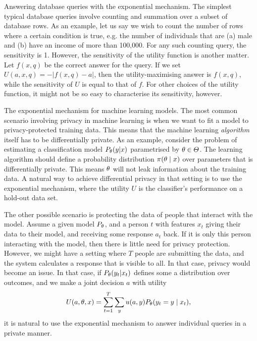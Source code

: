 \begin{exampleblock}{Answering database queries with the exponential mechanism.}
  The simplest typical database queries involve counting and summation over a subset of database rows. As an example, let us say we wish to count the number of rows where a certain condition is true, e.g. the number of individuals that are (a) male  and (b) have an income of more than 100,000. For any such counting query, the sensitivity is 1. However, the sensitivity of the utility function is another matter. Let $f(x,q)$ be the correct answer for the query. If we set $U(a,x,q) = -|f(x,q) - a|$, then the utility-maximising answer is $f(x,q)$, while the sensitivity of $U$ is equal to that of $f$. For other choices of the utility function, it might not be so easy to characterise its sensitivity, however.
\end{exampleblock}
\begin{exampleblock}{The exponential mechanism for machine learning models.}
  The most common scenario involving privacy in machine learning is  when we want to fit a model to privacy-protected training data. This means that the machine learning \emph{algorithm} itself has to be differentially private. As an example, consider the problem of estimating a classification model $P_\theta(y | x)$ parametrised by $\theta \in \Theta$. The learning algorithm should define a probability distribution $\pi(\theta \mid x)$ over parameters that is differentially private. This means $\theta$ will not leak information about the training data. A natural way to achieve differential privacy in that setting is to use the exponential mechanism, where the utility $U$ is the classifier's performance on a hold-out data set.

The other possible scenario is protecting the data of people that interact with the model. Assume a given model $P_\theta$, and a person $t$ with features $x_t$ giving their data to their model, and receiving some response $a_t$ back. If it is only this person interacting with the model, then there is little need for privacy protection. However, we might have a setting where $T$ people are submitting the data, and the system calculates a response that is visible to all. In that case, privacy would become an issue. In that case, if $P_\theta(y_t | x_t)$ defines some a distribution over outcomes, and we make a joint decision $a$ with utility
  \[
    U(a, \theta, x) = \sum_{t=1}^T \sum_y u(a, y) P_\theta(y_t = y \mid x_t),
  \]
  it is natural to use the exponential mechanism to answer individual queries in a private manner.
\end{exampleblock}

